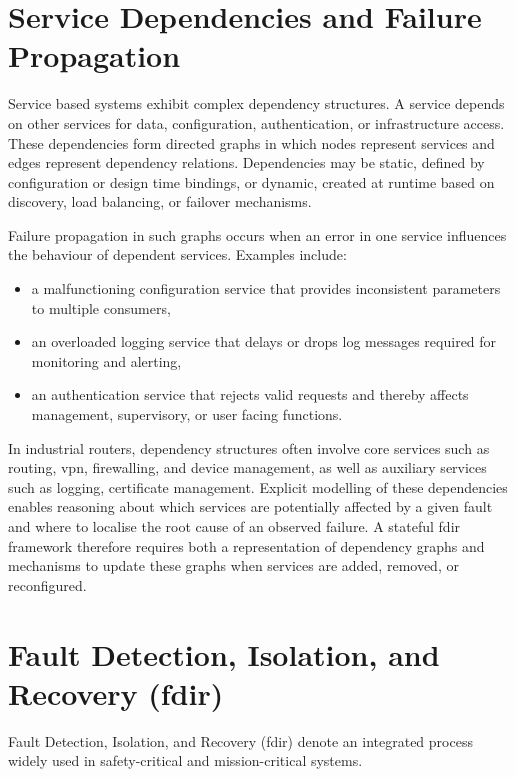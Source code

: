 \section{Service Dependencies and Failure Propagation}\label{sec:dependencies-propagation}

Service based systems exhibit complex dependency structures. A service depends on other services for data, configuration, authentication, or infrastructure access. These dependencies form directed graphs in which nodes represent services and edges represent dependency relations. Dependencies may be static, defined by configuration or design time bindings, or dynamic, created at runtime based on discovery, load balancing, or failover mechanisms.

Failure propagation in such graphs occurs when an error in one service influences the behaviour of dependent services. Examples include:

\begin{itemize}
\item a malfunctioning configuration service that provides inconsistent parameters to multiple consumers,
\item an overloaded logging service that delays or drops log messages required for monitoring and alerting,
\item an authentication service that rejects valid requests and thereby affects management, supervisory, or user facing functions.
\end{itemize}

In industrial routers, dependency structures often involve core services such as routing, \gls{vpn}, firewalling, and device management, as well as auxiliary services such as logging, certificate management. Explicit modelling of these dependencies enables reasoning about which services are potentially affected by a given fault and where to localise the root cause of an observed failure. A stateful \gls{fdir} framework therefore requires both a representation of dependency graphs and mechanisms to update these graphs when services are added, removed, or reconfigured.

\section{Fault Detection, Isolation, and Recovery (\gls{fdir})}\label{sec:fdir-background}

Fault Detection, Isolation, and Recovery (\gls{fdir}) denote an integrated process widely used in safety-critical and mission-critical systems.

